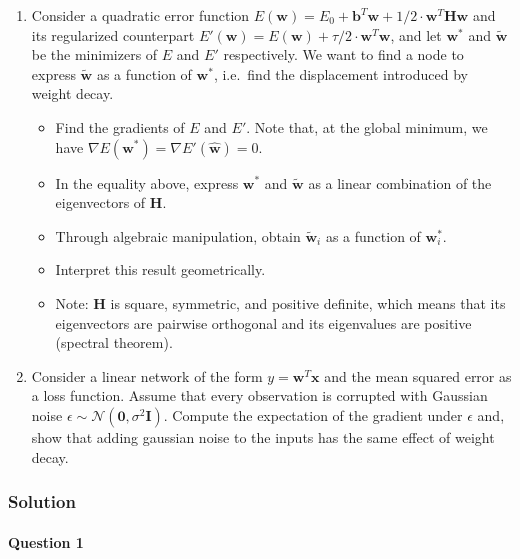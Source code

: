 \documentclass[
  a4paper,
]{article}
\providecommand{\tightlist}{%
  \setlength{\itemsep}{0pt}\setlength{\parskip}{0pt}}
\begin{document}
\begin{enumerate}
\def\labelenumi{\arabic{enumi}.}
\item
  Consider a quadratic error function
  \(E(\textbf{w})=E_0+\textbf{b}^T\textbf{w}+1/2\cdot\textbf{w}^T\textbf{H}\textbf{w}\)
  and its regularized counterpart
  \(E'(\textbf{w})=E(\textbf{w})+\tau/2 \cdot\textbf{w}^T\textbf{w}\),
  and let \(\textbf{w}^*\) and \(\tilde{\textbf{w}}\) be the minimizers
  of \(E\) and \(E'\) respectively. We want to find a node to express
  \(\tilde{\textbf{w}}\) as a function of \(\textbf{w}^*\), i.e.~find
  the displacement introduced by weight decay.

  \begin{itemize}
  \tightlist
  \item
    Find the gradients of \(E\) and \(E'\). Note that, at the global
    minimum, we have
    \(\nabla E(\textbf{w}^*)=\nabla E'(\hat{\textbf{w}})=0\).
  \item
    In the equality above, express \(\textbf{w}^*\) and
    \(\tilde{\textbf{w}}\) as a linear combination of the eigenvectors
    of \(\textbf{H}\).
  \item
    Through algebraic manipulation, obtain \(\tilde{\textbf{w}}_i\) as a
    function of \(\textbf{w}^*_i\).
  \item
    Interpret this result geometrically.
  \item
    Note: \(\textbf{H}\) is square, symmetric, and positive definite,
    which means that its eigenvectors are pairwise orthogonal and its
    eigenvalues are positive (spectral theorem).
  \end{itemize}
\item
  Consider a linear network of the form \(y=\textbf{w}^T\textbf{x}\) and
  the mean squared error as a loss function. Assume that every
  observation is corrupted with Gaussian noise
  \(\epsilon\sim\mathcal{N}(\textbf{0}, \sigma^2\textbf{I})\). Compute
  the expectation of the gradient under \(\epsilon\) and, show that
  adding gaussian noise to the inputs has the same effect of weight
  decay.
\end{enumerate}

\hypertarget{solution}{%
\subsubsection{Solution}\label{solution}}

\hypertarget{question-1}{%
\paragraph{Question 1}\label{question-1}}
\end{document}
